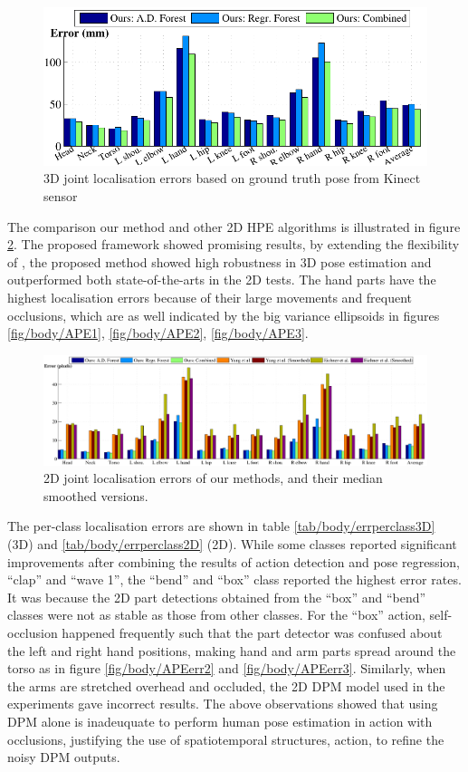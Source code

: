 \begin{figure}[ht]
\centering
	\includegraphics[width=0.8\linewidth]{fig/body/errplot3d.pdf} 
	\caption{3D joint localisation errors based on ground truth pose from Kinect sensor}
\label{fig/body/errorplot3d}
\end{figure}

The comparison our method and other 2D HPE algorithms is illustrated in figure \ref{fig/body/errorplot2d}.
The proposed framework showed promising results, by extending the flexibility of \cite{Yang2011}, the proposed method showed high robustness in 3D pose estimation and outperformed both state-of-the-arts in the 2D tests. The hand parts have the highest localisation errors because of their large movements and frequent occlusions, which are as well indicated by the big variance ellipsoids in figures \ref{fig/body/APE1}, \ref{fig/body/APE2}, \ref{fig/body/APE3}.

\begin{figure}[ht]
	\centering
	\includegraphics[width=1.00\linewidth]{fig/body/errplot2d.pdf} 
	\caption{2D joint localisation errors of our methods, \cite{Yang2011} and \cite{Eichner2012} their median smoothed versions.}
\label{fig/body/errorplot2d}
\end{figure} 

The per-class localisation errors are shown in table \ref{tab/body/errperclass3D} (3D) and \ref{tab/body/errperclass2D} (2D). While some classes reported significant improvements after combining the results of action detection and pose regression, \eg ``clap'' and ``wave 1'', the ``bend'' and ``box'' class reported the highest error rates. It was because the 2D part detections obtained from the ``box'' and ``bend'' classes were not as stable as those from other classes. For the ``box'' action, self-occlusion happened frequently such that the part detector was confused about the left and right hand positions, making hand and arm parts spread around the torso as in figure \ref{fig/body/APEerr2} and \ref{fig/body/APEerr3}. 
Similarly, when the arms are stretched overhead and occluded, the 2D DPM model used in the experiments gave incorrect results. The above observations showed that using DPM alone is inadeuquate to perform human pose estimation in action with occlusions, justifying the use of spatiotemporal structures, \ie action, to refine the noisy DPM outputs.  

